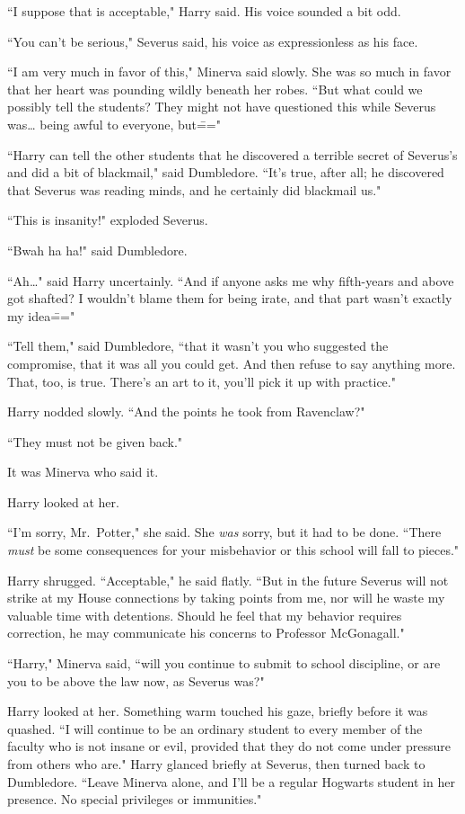 ``I suppose that is acceptable," Harry said. His voice sounded a bit odd.

``You can't be serious," Severus said, his voice as expressionless as his face.

``I am very much in favor of this," Minerva said slowly. She was so much in favor that her heart was pounding wildly beneath her robes. ``But what could we possibly tell the students? They might not have questioned this while Severus was{\ldots} being awful to everyone, but\==="

``Harry can tell the other students that he discovered a terrible secret of Severus's and did a bit of blackmail," said Dumbledore. ``It's true, after all; he discovered that Severus was reading minds, and he certainly did blackmail us."

``This is insanity!" exploded Severus.

``Bwah ha ha!" said Dumbledore.

``Ah{\ldots}" said Harry uncertainly. ``And if anyone asks me why fifth-years and above got shafted? I wouldn't blame them for being irate, and that part wasn't exactly my idea\==="

``Tell them," said Dumbledore, ``that it wasn't you who suggested the compromise, that it was all you could get. And then refuse to say anything more. That, too, is true. There's an art to it, you'll pick it up with practice."

Harry nodded slowly. ``And the points he took from Ravenclaw?"

``They must not be given back."

It was Minerva who said it.

Harry looked at her.

``I'm sorry, Mr.~Potter," she said. She \emph{was} sorry, but it had to be done. ``There \emph{must} be some consequences for your misbehavior or this school will fall to pieces."

Harry shrugged. ``Acceptable," he said flatly. ``But in the future Severus will not strike at my House connections by taking points from me, nor will he waste my valuable time with detentions. Should he feel that my behavior requires correction, he may communicate his concerns to Professor McGonagall."

``Harry," Minerva said, ``will you continue to submit to school discipline, or are you to be above the law now, as Severus was?"

Harry looked at her. Something warm touched his gaze, briefly before it was quashed. ``I will continue to be an ordinary student to every member of the faculty who is not insane or evil, provided that they do not come under pressure from others who are." Harry glanced briefly at Severus, then turned back to Dumbledore. ``Leave Minerva alone, and I'll be a regular Hogwarts student in her presence. No special privileges or immunities."

